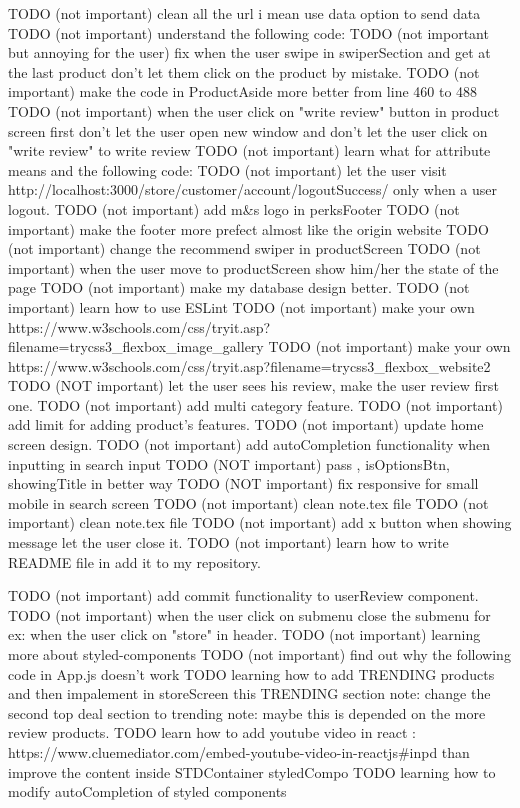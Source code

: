 TODO (not important) clean all the url i mean use data option to send data 
TODO (not important) understand the following code:
TODO (not important but annoying for the user) fix when the user swipe in swiperSection and get at the last product don't let them click on the product by mistake.
TODO (not important) make the code in ProductAside more better from line 460 to 488
TODO (not important) when the user click on "write review" button in product screen first don't let the user open new window and don't let the user click on "write review" to write review
TODO (not important) learn what for attribute means and the following code:
TODO (not important) let the user visit http://localhost:3000/store/customer/account/logoutSuccess/ only when a user logout.
TODO (not important) add m&s logo in perksFooter
TODO (not important) make the footer more prefect almost like the origin website
TODO (not important) change the recommend swiper in productScreen
TODO (not important) when the user move to productScreen show him/her the state of the page
TODO (not important) make my database design better.
TODO (not important) learn how to use ESLint
TODO (not important) make your own https://www.w3schools.com/css/tryit.asp?filename=trycss3_flexbox_image_gallery
TODO (not important) make your own https://www.w3schools.com/css/tryit.asp?filename=trycss3_flexbox_website2
TODO (NOT important) let the user sees his review, make the user review first one.
TODO (not important) add multi category feature.
TODO (not important) add limit for adding product's features. 
TODO (not important) update home screen design.
TODO (not important) add autoCompletion functionality when inputting in search input
TODO (NOT important) pass , isOptionsBtn, showingTitle in better way 
TODO (NOT important) fix responsive for small mobile in search screen
TODO (not important) clean note.tex file
TODO (not important) clean note.tex file
TODO (not important) add x button when showing message let the user close it. 
TODO (not important) learn how to write README file in add it to my repository.

TODO (not important) add commit functionality to userReview component.
TODO (not important) when the user click on submenu close the submenu for ex: when the user click on "store" in header.
TODO (not important) learning more about styled-components
TODO (not important) find out why the following code in App.js doesn't work
TODO   learning how to add TRENDING products and then impalement in storeScreen this TRENDING section
      note: change the second top deal section to trending 
      note: maybe this is depended on the more review products.
TODO learn how to add youtube video in react : 
https://www.cluemediator.com/embed-youtube-video-in-reactjs#inpd
than improve the content inside STDContainer styledCompo 
TODO   learning how to modify autoCompletion of styled components 
